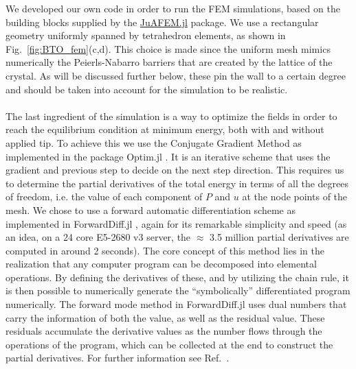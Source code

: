 We developed our own code in order to run the FEM simulations, based on the building blocks supplied by the \href{https://github.com/KristofferC/JuAFEM.jl}{JuAFEM.jl} package.
We use a rectangular geometry uniformly spanned by tetrahedron elements, as shown in Fig.~\ref{fig:BTO_fem}(c,d).
This choice is made since the uniform mesh mimics numerically the Peierls-Nabarro barriers that are created by the lattice of the crystal.
As will be discussed further below, these pin the wall to a certain degree and should be taken into account for the simulation to be realistic.
\\\\
The last ingredient of the simulation is a way to optimize the fields in order to reach the equilibrium condition at minimum energy, both with and without applied tip.
To achieve this we use the Conjugate Gradient Method \cite{Hestenes1952,Hager2005} as implemented in the package Optim.jl \cite{mogensen2018optim}.
It is an iterative scheme that uses the gradient and previous step to decide on the next step direction. 
This requires us to determine the partial derivatives of the total energy in terms of all the degrees of freedom, i.e. the value of each component of $P$ and $u$ at the node points of the mesh.
We chose to use a forward automatic differentiation scheme as implemented in ForwardDiff.jl \cite{RevelsLubinPapamarkou2016}, again for its remarkable simplicity and speed (as an idea, on a 24 core E5-2680 v3 server, the $\approx$ 3.5 million partial derivatives are computed in around 2 seconds).
The core concept of this method lies in the realization that any computer program can be decomposed into elemental operations. By defining the derivatives of these, and by utilizing the chain rule, it is then possible to numerically generate the ``symbolically'' differentiated program numerically.
The forward mode method in ForwardDiff.jl uses dual numbers that carry the information of both the value, as well as the residual value. These residuals accumulate the derivative values as the number flows through the operations of the program, which can be collected at the end to construct the partial derivatives.
For further information see Ref.~\cite{Hoffmann2016}.
